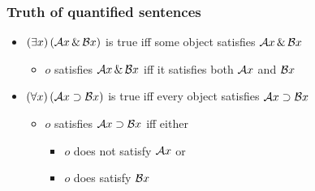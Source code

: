 \begin{frame}
  \frametitle{Truth of quantified sentences}

  \begin{itemize}[<+->]
    \item $(\exists x)\,(\mathcal{A}x \,\&\, \mathcal{B}x)$ is true iff some object satisfies $\mathcal{A}x \,\&\, \mathcal{B}x$
    \begin{itemize}
      \item $o$ satisfies $\mathcal{A}x \,\&\, \mathcal{B}x$ iff it satisfies both $\mathcal{A}x$ and $\mathcal{B}x$
    \end{itemize}
    \item $(\forall x)\,(\mathcal{A}x \supset \mathcal{B}x)$ is true iff every object satisfies $\mathcal{A}x \supset \mathcal{B}x$
    \begin{itemize}
      \item $o$ satisfies $\mathcal{A}x \supset \mathcal{B}x$ iff
      either
      \begin{itemize}
        \item $o$ does not satisfy $\mathcal{A}x$ or
        \item $o$ does satisfy $\mathcal{B}x$
      \end{itemize}
    \end{itemize}
  \end{itemize}
\end{frame}


